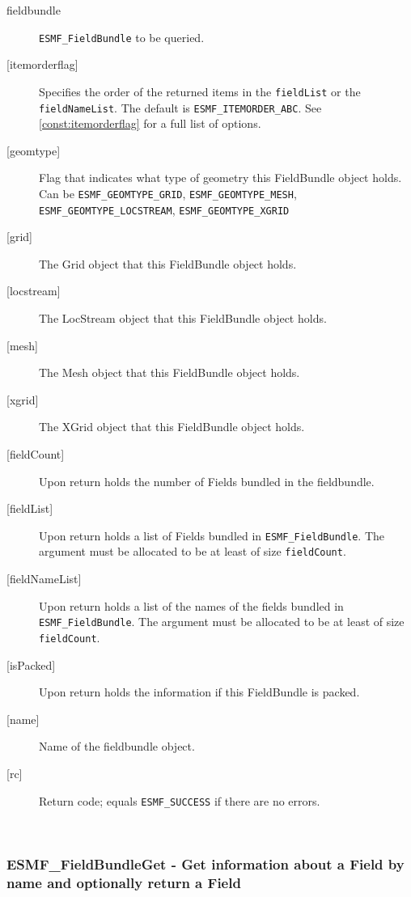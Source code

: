    \begin{description}
   \item [fieldbundle]
   {\tt ESMF\_FieldBundle} to be queried.
   \item [{[itemorderflag]}]
   Specifies the order of the returned items in the {\tt fieldList} or the
   {\tt fieldNameList}.
   The default is {\tt ESMF\_ITEMORDER\_ABC}.
   See \ref{const:itemorderflag} for a full list of options.
   \item[{[geomtype]}]
   Flag that indicates what type of geometry this FieldBundle object holds.
   Can be {\tt ESMF\_GEOMTYPE\_GRID}, {\tt ESMF\_GEOMTYPE\_MESH}, {\tt ESMF\_GEOMTYPE\_LOCSTREAM},
   {\tt ESMF\_GEOMTYPE\_XGRID}
   \item[{[grid]}]
   The Grid object that this FieldBundle object holds.
   \item[{[locstream]}]
   The LocStream object that this FieldBundle object holds.
   \item[{[mesh]}]
   The Mesh object that this FieldBundle object holds.
   \item[{[xgrid]}]
   The XGrid object that this FieldBundle object holds.
   \item [{[fieldCount]}]
   Upon return holds the number of Fields bundled in the fieldbundle.
   \item [{[fieldList]}]
   Upon return holds a list of Fields bundled in {\tt ESMF\_FieldBundle}. The
   argument must be allocated to be at least of size {\tt fieldCount}.
   \item [{[fieldNameList]}]
   Upon return holds a list of the names of the fields bundled in
   {\tt ESMF\_FieldBundle}. The argument must be allocated to be at least of
   size {\tt fieldCount}.
   \item [{[isPacked]}]
   Upon return holds the information if this FieldBundle is packed.
   \item [{[name]}]
   Name of the fieldbundle object.
   \item [{[rc]}]
   Return code; equals {\tt ESMF\_SUCCESS} if there are no errors.
   \end{description}
   
 
\mbox{}\hrulefill\ 
 
\subsubsection [ESMF\_FieldBundleGet] {ESMF\_FieldBundleGet - Get information about a Field by name and optionally return a Field}



